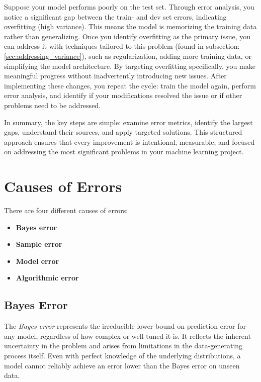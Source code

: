 \documentclass[12pt,openany]{book}
\begin{document}
\begin{examplebox}
Suppose your model performs poorly on the test set. Through error analysis, you notice a significant gap between the train- and dev set errors, indicating overfitting (high variance). This means the model is memorizing the training data rather than generalizing. Once you identify overfitting as the primary issue, you can address it with techniques tailored to this problem (found in subsection: \ref{sec:addressing_variance}), such as regularization, adding more training data, or simplifying the model architecture. By targeting overfitting specifically, you make meaningful progress without inadvertently introducing new issues. After implementing these changes, you repeat the cycle: train the model again, perform error analysis, and identify if your modifications resolved the issue or if other problems need to be addressed.
\end{examplebox}

In summary, the key steps are simple: examine error metrics, identify the largest gaps, understand their sources, and apply targeted solutions. This structured approach ensures that every improvement is intentional, measurable, and focused on addressing the most significant problems in your machine learning project.



\section{Causes of Errors}

There are four different causes of errors:
\begin{itemize}
    \item \textbf{Bayes error}
    \item \textbf{Sample error}
    \item \textbf{Model error}
    \item \textbf{Algorithmic error}
\end{itemize}


\subsection{Bayes Error}

The \textit{Bayes error} represents the irreducible lower bound on prediction error for any model, regardless of how complex or well-tuned it is. It reflects the inherent uncertainty in the problem and arises from limitations in the data-generating process itself. Even with perfect knowledge of the underlying distributions, a model cannot reliably achieve an error lower than the Bayes error on unseen data. \newline
\end{document}
